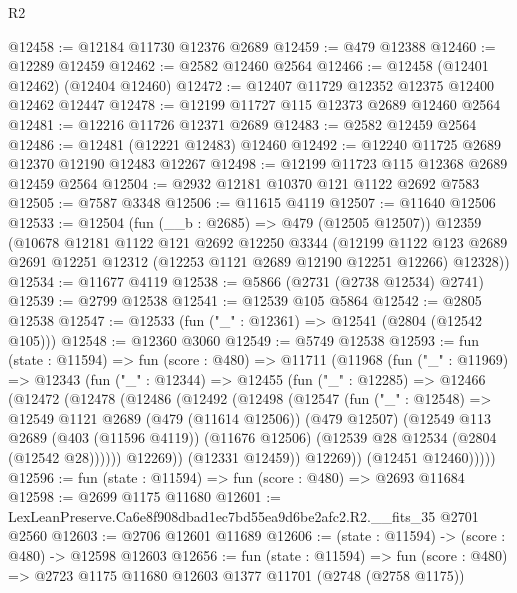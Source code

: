 \begin{lexlean}{R2}
\begin{coremodule}
@12458 := @12184 @11730 @12376 @2689
@12459 := @479 @12388
@12460 := @12289 @12459
@12462 := @2582 @12460 @2564
@12466 := @12458 (@12401 @12462) (@12404 @12460)
@12472 := @12407 @11729 @12352 @12375 @12400 @12462 @12447
@12478 := @12199 @11727 @115 @12373 @2689 @12460 @2564
@12481 := @12216 @11726 @12371 @2689
@12483 := @2582 @12459 @2564
@12486 := @12481 (@12221 @12483) @12460
@12492 := @12240 @11725 @2689 @12370 @12190 @12483 @12267
@12498 := @12199 @11723 @115 @12368 @2689 @12459 @2564
@12504 := @2932 @12181 @10370 @121 @1122 @2692 @7583
@12505 := @7587 @3348
@12506 := @11615 @4119
@12507 := @11640 @12506
@12533 := @12504
    (fun (__b : @2685) => @479 (@12505 @12507))
    @12359
    (@10678
      @12181
      @1122
      @121
      @2692
      @12250
      @3344
      (@12199
        @1122
        @123
        @2689
        @2691
        @12251
        @12312
        (@12253 @1121 @2689 @12190 @12251 @12266)
        @12328))
@12534 := @11677 @4119
@12538 := @5866 (@2731 (@2738 @12534) @2741)
@12539 := @2799 @12538
@12541 := @12539 @105 @5864
@12542 := @2805 @12538
@12547 := @12533 (fun ("_" : @12361) => @12541 (@2804 (@12542 @105)))
@12548 := @12360 @3060
@12549 := @5749 @12538
@12593 := fun (state : @11594) =>
  fun (score : @480) =>
  @11711
    (@11968
      (fun ("_" : @11969) =>
      @12343
        (fun ("_" : @12344) =>
        @12455
          (fun ("_" : @12285) =>
          @12466
            (@12472
              (@12478
                (@12486
                  (@12492
                    (@12498
                      (@12547
                        (fun ("_" : @12548) =>
                        @12549
                          @1121
                          @2689
                          (@479 (@11614 @12506))
                          (@479 @12507)
                          (@12549
                            @113
                            @2689
                            (@403 (@11596 @4119))
                            (@11676 @12506)
                            (@12539 @28 @12534 (@2804 (@12542 @28))))))
                      @12269))
                  (@12331 @12459))
                @12269))
            (@12451 @12460)))))
@12596 := fun (state : @11594) => fun (score : @480) => @2693 @11684
@12598 := @2699 @1175 @11680
@12601 := LexLeanPreserve.Ca6e8f908dbad1ec7bd55ea9d6be2afc2.R2.__fits_35 @2701 @2560
@12603 := @2706 @12601 @11689
@12606 := (state : @11594) -> (score : @480) -> @12598 @12603
@12656 := fun (state : @11594) =>
  fun (score : @480) =>
  @2723
    @1175
    @11680
    @12603
    @1377
    @11701
    (@2748 (@2758 @1175))

\end{coremodule}
\end{lexlean}
